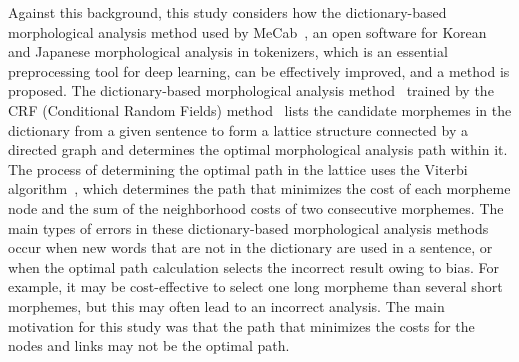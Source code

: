 \documentclass[AMS,STIX2COL]{WileyNJD-v2}
\begin{document}
    Against this background, this study considers how the dictionary-based morphological analysis method used by MeCab~\cite{MeCab}, an open software for Korean and Japanese morphological analysis in tokenizers, which is an essential preprocessing tool for deep learning, can be effectively improved, and a method is proposed.
    The dictionary-based morphological analysis method~\cite{Kudo2004, NaSH2014, NaSH2018} trained by the CRF (Conditional Random Fields) method~\cite{Lafferty2001} lists the candidate morphemes in the dictionary from a given sentence to form a lattice structure connected by a directed graph and determines the optimal morphological analysis path within it.
    The process of determining the optimal path in the lattice uses the Viterbi algorithm~\cite{Viterbi1967}, which determines the path that minimizes the cost of each morpheme node and the sum of the neighborhood costs of two consecutive morphemes.
    The main types of errors in these dictionary-based morphological analysis methods occur when new words that are not in the dictionary are used in a sentence, or when the optimal path calculation selects the incorrect result owing to bias.
    For example, it may be cost-effective to select one long morpheme than several short morphemes, but this may often lead to an incorrect analysis.
    The main motivation for this study was that the path that minimizes the costs for the nodes and links may not be the optimal path.
\end{document}
